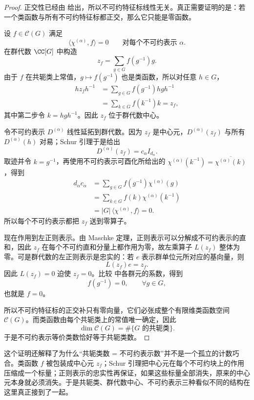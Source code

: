 \begin{proof}
正交性已经由  给出，所以不可约特征标线性无关。真正需要证明的是：若一个类函数与所有不可约特征标都正交，那么它只能是零函数。

设 $f\in\mathcal C(G)$ 满足
\[
\langle\chi^{(\alpha)},f\rangle=0
\qquad
\text{对每个不可约表示 }\alpha.
\]
在群代数 $\CC[G]$ 中构造
\begin{equation}
z_f=\sum_{g\in G}f(g^{-1})g.
\label{eq:class-function-central-element}
\end{equation}
由于 $f$ 在共轭类上常值，$g\mapsto f(g^{-1})$ 也是类函数，所以对任意 $h\in G$，
\begin{align*}
hz_fh^{-1}
&=\sum_{g\in G}f(g^{-1})hgh^{-1}\\
&=\sum_{k\in G}f(k^{-1})k=z_f,
\end{align*}
其中第二步令 $k=hgh^{-1}$。因此 $z_f$ 位于群代数中心。

令不可约表示 $D^{(\alpha)}$ 线性延拓到群代数。因为 $z_f$ 是中心元，$D^{(\alpha)}(z_f)$ 与所有 $D^{(\alpha)}(h)$ 对易；Schur 引理于是给出
\[
D^{(\alpha)}(z_f)=c_\alpha I_{d_\alpha}.
\]
取迹并令 $k=g^{-1}$，再使用不可约表示可酉化所给出的
$\chi^{(\alpha)}(k^{-1})=\overline{\chi^{(\alpha)}(k)}$，得到
\begin{align*}
d_\alpha c_\alpha
&=\sum_{g\in G}f(g^{-1})\chi^{(\alpha)}(g)\\
&=\sum_{k\in G}f(k)\chi^{(\alpha)}(k^{-1})\\
&=|G|\,\langle\chi^{(\alpha)},f\rangle=0.
\end{align*}
所以每个不可约表示都把 $z_f$ 送到零算子。

现在作用到左正则表示。由 Maschke 定理，正则表示可以分解成不可约表示的直和，因此 $z_f$ 在每个不可约直和分量上都作用为零，故左乘算子 $L(z_f)$ 整体为零。可是群代数的左正则表示是忠实的：若 $e$ 表示群单位元所对应的基向量，则
\[
L(z_f)e=z_f.
\]
因此 $L(z_f)=0$ 迫使 $z_f=0$。比较  中各群元的系数，得到
\[
f(g^{-1})=0,
\qquad\forall g\in G,
\]
也就是 $f=0$。

所以不可约特征标的正交补只有零向量，它们必张成整个有限维类函数空间 $\mathcal C(G)$。而类函数由每个共轭类上的常值唯一确定，因此
\[
\dim\mathcal C(G)=\#\{\text{$G$ 的共轭类}\}.
\]
于是不可约表示等价类数恰好等于共轭类数。
\end{proof}

这个证明还解释了为什么“共轭类数 = 不可约表示数”并不是一个孤立的计数巧合。类函数 $f$ 被包装成中心元 $z_f$；Schur 引理把中心元在每个不可约块上的作用压缩成一个标量；正则表示的忠实性再保证，如果这些标量全部消失，原来的中心元本身就必须消失。于是共轭类、群代数中心、不可约表示三种看似不同的结构在这里真正接到了一起。

